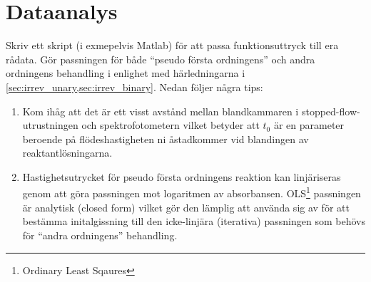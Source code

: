 \section{Dataanalys}
\label{sec:analys}
Skriv ett skript (i exmepelvis Matlab) för att passa funktionsuttryck
till era rådata. Gör passningen för både ``pseudo första ordningens''
och andra ordningens behandling i enlighet med härledningarna i
\cref{sec:irrev_unary,sec:irrev_binary}. Nedan följer några tips:

\begin{enumerate}
\item Kom ihåg att det är ett visst
avstånd mellan blandkammaren i stopped-flow-utrustningen och
spektrofotometern vilket betyder att $t_0$ är en parameter beroende på
flödeshastigheten ni åstadkommer vid blandingen av reaktantlösningarna.
\item Hastighetsutrycket för pseudo första ordningens reaktion kan
  linjäriseras genom att göra passningen mot logaritmen av
  absorbansen. OLS\footnote{Ordinary Least Sqaures} passningen är
  analytisk (closed form) vilket gör den lämplig att använda sig av för
  att bestämma initalgissning till den icke-linjära (iterativa)
  passningen som behövs för ``andra ordningens'' behandling.
\end{enumerate}


